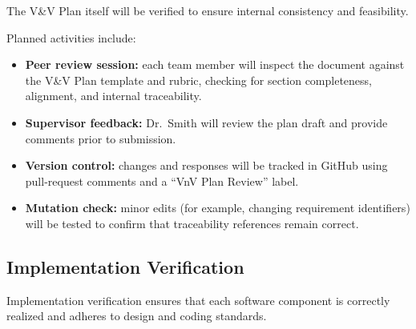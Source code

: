 \documentclass[12pt, titlepage]{article}
\begin{document}
The V\&V Plan itself will be verified to ensure internal consistency and
feasibility.

Planned activities include:

\begin{itemize}
  \item \textbf{Peer review session:} each team member will inspect the document
  against the V\&V Plan template and rubric, checking for section completeness,
  alignment, and internal traceability.

  \item \textbf{Supervisor feedback:} Dr.~Smith will review the plan draft and
  provide comments prior to submission.

  \item \textbf{Version control:} changes and responses will be tracked in
  GitHub using pull-request comments and a ``VnV Plan Review'' label.

  \item \textbf{Mutation check:} minor edits (for example, changing requirement
  identifiers) will be tested to confirm that traceability references remain
  correct.
\end{itemize}

\subsection{Implementation Verification}
\label{subsec:implementation-verification}


Implementation verification ensures that each software component is correctly
realized and adheres to design and coding standards.
\end{document}
